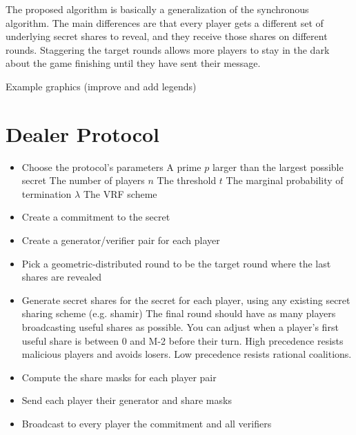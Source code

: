 \documentclass{dalcsthesis}
\begin{document}
The proposed algorithm is basically a generalization of the synchronous algorithm. The main differences are that every player gets a different set of underlying secret shares to reveal, and they receive those shares on different rounds. Staggering the target rounds allows more players to stay in the dark about the game finishing until they have sent their message.

Example graphics (improve and add legends)

\section{Dealer Protocol}
\begin{itemize}
  \item Choose the protocol's parameters
    \subitem A prime $p$ larger than the largest possible secret
    \subitem The number of players $n$
    \subitem The threshold $t$
    \subitem The marginal probability of termination $\lambda$
    \subitem The VRF scheme
  \item Create a commitment to the secret
  \item Create a generator/verifier pair for each player
  \item Pick a geometric-distributed round to be the target round where the last shares are revealed
  \item Generate secret shares for the secret for each player, using any existing secret sharing scheme (e.g. shamir)
    \subitem The final round should have as many players broadcasting useful shares as possible.
    \subitem You can adjust when a player's first useful share is between 0 and M-2 before their turn.
    \subitem High precedence resists malicious players and avoids losers.
    \subitem Low precedence resists rational coalitions.
  \item Compute the share masks for each player pair
  \item Send each player their generator and share masks
  \item Broadcast to every player the commitment and all verifiers
\end{itemize}
\end{document}
